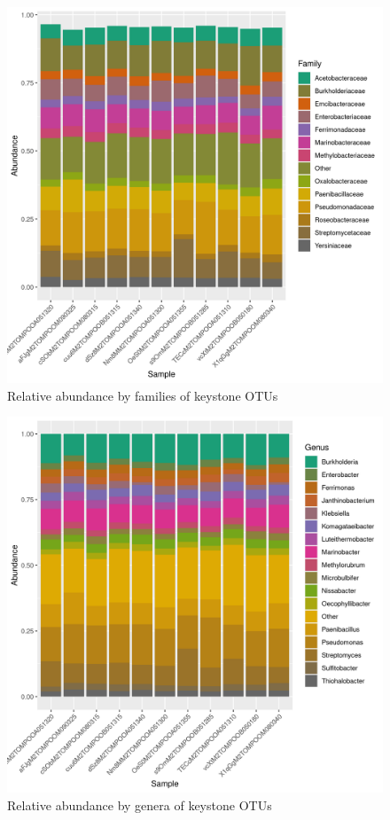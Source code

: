\begin{figure}
\centering
\includegraphics[scale = 0.8]{tomate_aleatorio1_1.csv_relative_abundance_Family.png}
\caption{Relative abundance by families of keystone OTUs }
\label{fig:tomate_aleatorio1_1.csv_family}
\end{figure}
\begin{figure}
\centering
\includegraphics[scale = 0.8]{tomate_aleatorio1_1.csv_relative_abundance_Genus.png}
\caption{Relative abundance by genera of keystone OTUs }
\label{fig:tomate_aleatorio1_1.csv_genus}
\end{figure}
